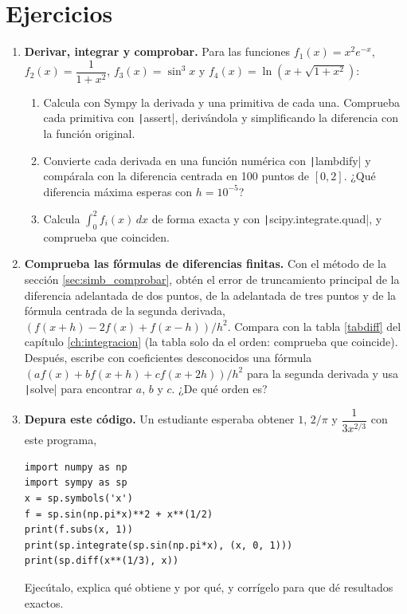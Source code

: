 \section{Ejercicios}
\begin{enumerate}
\item \label{ej:sim_deriv_int} \textbf{Derivar, integrar y comprobar.} Para las funciones $f_1(x)=x^2e^{-x}$, $f_2(x)=\dfrac{1}{1+x^2}$, $f_3(x)=\sin^3 x$ y $f_4(x)=\ln(x+\sqrt{1+x^2})$:
\begin{enumerate}
\item Calcula con Sympy la derivada y una primitiva de cada una. Comprueba cada primitiva con \texttt|assert|, derivándola y simplificando la diferencia con la función original.
\item Convierte cada derivada en una función numérica con \texttt|lambdify| y compárala con la diferencia centrada en 100 puntos de $[0,2]$. ¿Qué diferencia máxima esperas con $h=10^{-5}$?
\item Calcula $\int_0^2 f_i(x)\,dx$ de forma exacta y con \texttt|scipy.integrate.quad|, y comprueba que coinciden.
\end{enumerate}

\item \label{ej:sim_taylor_dif} \textbf{Comprueba las fórmulas de diferencias finitas.} Con el método de la sección \ref{sec:simb_comprobar}, obtén el error de truncamiento principal de la diferencia adelantada de dos puntos, de la adelantada de tres puntos y de la fórmula centrada de la segunda derivada, $\left(f(x+h)-2f(x)+f(x-h)\right)/h^2$. Compara con la tabla \ref{tabdiff} del capítulo \ref{ch:integracion} (la tabla solo da el orden: comprueba que coincide). Después, escribe con coeficientes desconocidos una fórmula $\left(a f(x)+b f(x+h)+c f(x+2h)\right)/h^2$ para la segunda derivada y usa \texttt|solve| para encontrar $a$, $b$ y $c$. ¿De qué orden es?

\item \label{ej:sim_depura} \textbf{Depura este código.} Un estudiante esperaba obtener $1$, $2/\pi$ y $\dfrac{1}{3x^{2/3}}$ con este programa,
\begin{verbatim}
import numpy as np
import sympy as sp
x = sp.symbols('x')
f = sp.sin(np.pi*x)**2 + x**(1/2)
print(f.subs(x, 1))
print(sp.integrate(sp.sin(np.pi*x), (x, 0, 1)))
print(sp.diff(x**(1/3), x))
\end{verbatim}
Ejecútalo, explica qué obtiene y por qué, y corrígelo para que dé resultados exactos.


\end{enumerate}
